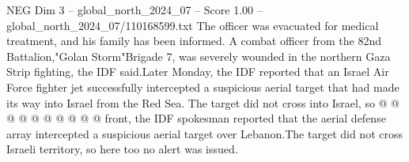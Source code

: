 \begin{textsample}{NEG Dim 3 – global\_north\_2024\_07 – Score 1.00 – global\_north\_2024\_07/110168599.txt}
The officer was evacuated for medical treatment, and his family has been informed.
A combat officer from the 82nd Battalion,"Golan Storm"Brigade 7, was severely wounded in the northern Gaza Strip fighting, the IDF said.Later Monday, the IDF reported that an Israel Air Force fighter jet successfully intercepted a suspicious aerial target that had made its way into Israel from the Red Sea.
The target did not cross into Israel, so @ @ @ @ @ @ @ @ @ @ front, the IDF spokesman reported that the aerial defense array intercepted a suspicious aerial target over Lebanon.The target did not cross Israeli territory, so here too no alert was issued.

\end{textsample}
